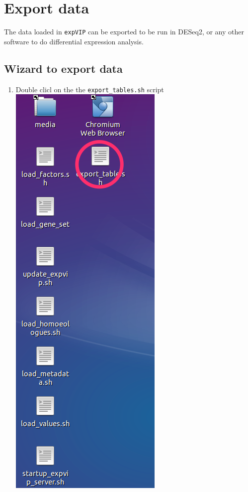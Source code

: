 \section{Export data}\label{export-data}

The data loaded in \lstinline!expVIP! can be exported to be run in
DESeq2, or any other software to do differential expression analysis.

\subsection{Wizard to export data}\label{wizard-to-export-data}

\begin{enumerate}
\def\labelenumi{\arabic{enumi}.}
\itemsep1pt\parskip0pt
\item
  Double clicl on the the \lstinline!export_tables.sh! script
  \includegraphics{images/ExportData01.png}

\end{enumerate}
